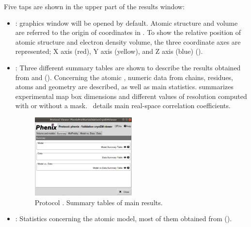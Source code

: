 \begin{itemize}
Five taps are shown in the upper part of the results window:
   \begin{itemize}
     \item {}: \chimera graphics window will be opened by default. Atomic structure and volume are referred to the origin of coordinates in \chimera. To show the relative position of atomic structure and electron density volume, the three coordinate axes are represented; X axis (red), Y axis (yellow), and Z axis (blue) ().
     \item {}: Three different summary tables are shown to describe the results obtained from  and  (). Concerning the atomic , numeric data from chains, residues, atoms and geometry are described, as well as main \molprobity statistics.  summarizes experimental map box dimensions and different values of resolution computed with or without a mask. \ details main real-space correlation coefficients.
        \begin{figure}[H]
         \centering 
         \captionsetup{width=.9\linewidth} 
         \includegraphics[width=0.50\textwidth]{Images_appendix/Fig201.pdf}
         \caption{Protocol . Summary tables of main\phenix {} results.}
         \label{fig:validationCryoEM_protocol_3}
        \end{figure}
     \item {}: Statistics concerning the atomic model, most of them obtained from \molprobity ().
        \begin{figure}[H]
         \centering 
         \captionsetup{width=.9\linewidth} 

\end{figure}
\end{itemize}
\end{itemize}
